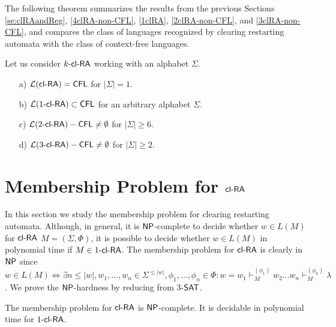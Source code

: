 The following theorem summarizes the results from the previous Sections
\ref{se:clRAandReg}, \ref{4clRA-non-CFL}, \ref{1clRA}, \ref{2clRA-non-CFL}, and \ref{3clRA-non-CFL},
and compares the class of languages recognized by clearing restarting automata
with the class of context-free languages.

\begin{theorem} Let us consider $\kclRA$ working with an alphabet $\Sigma$.
\begin{enumerate}
    \item[a)]
        $\calL{\clRA} = \CFL$ for $|\Sigma| = 1$.
    \item[b)]
        $\calL{\kclRA[1]} \subset \CFL$ for an arbitrary alphabet $\Sigma$.
    \item[c)]
        $\calL{\kclRA[2]} - \CFL \not= \emptyset$ for $|\Sigma| \ge 6$.
    \item[d)]
        $\calL{\kclRA[3]} - \CFL \not= \emptyset$ for $|\Sigma| \ge 2$.
\end{enumerate}
\end{theorem}

\section[\texorpdfstring{Membership Problem for $\clRA$}%
                        {Membership Problem for cl-RA}]%
                        {Membership Problem for $\bm{\clRA}$}%
\label{clra_membership}

In this section we study the membership problem for clearing restarting automata. Although, in general, it is $\classNP$-complete to decide whether $w \in L(M)$ for $\clRA$ $M = (\Sigma, \Phi)$, it is possible to decide whether $w \in L(M)$ in polynomial time if $M \in \kclRA[1]$. The membership problem for $\clRA$ is clearly in $\classNP$ since $w \in L(M) \Leftrightarrow \exists n \le |w|, w_1, \ldots, w_n \in \Sigma^{\le |w|}, \phi_1, \ldots, \phi_n \in \Phi: w = w_1 \vdash_M^{(\phi_1)} w_2 \ldots w_n \vdash_M^{(\phi_n)} \lambda$. We prove the $\classNP$-hardness by reducing from $3$-$\SAT$.

\begin{theorem}\label{theorem:clra_membership}
The membership problem for $\clRA$ is $\classNP$-complete. It is decidable in polynomial time for $\kclRA[1]$.
\end{theorem}

